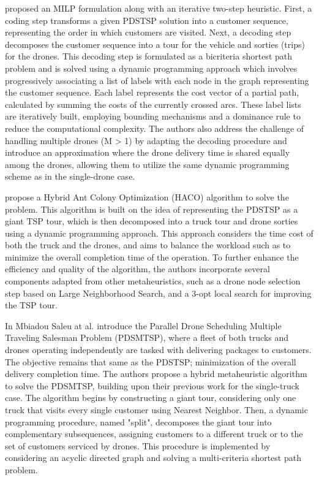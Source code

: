 \documentclass{article}
\begin{document}
	\par
	\citeauthor{MbiadouSaleu2018} \cite{MbiadouSaleu2018} proposed an MILP formulation along with an iterative two-step heuristic. First, a coding step transforms a given PDSTSP solution into a customer sequence, representing the order in which customers are visited. Next, a decoding step decomposes the customer sequence into a tour for the vehicle and sorties (trips) for the drones. This decoding step is formulated as a bicriteria shortest path problem \cite{biCriteriaSP} and is solved using a dynamic programming approach which involves progressively associating a list of labels with each node in the graph representing the customer sequence. Each label represents the cost vector of a partial path, calculated by summing the costs of the currently crossed arcs. These label lists are iteratively built, employing bounding mechanisms and a dominance rule to reduce the computational complexity. The authors also address the challenge of handling multiple drones (M > 1) by adapting the decoding procedure and introduce an approximation where the drone delivery time is shared equally among the drones, allowing them to utilize the same dynamic programming scheme as in the single-drone case.
	\par 
	\citeauthor{Dinh2021} \cite{Dinh2021} propose a Hybrid Ant Colony Optimization (HACO) algorithm to solve the problem. This algorithm is built on the idea of representing the PDSTSP as a giant TSP tour, which is then decomposed into a truck tour and drone sorties using a dynamic programming approach. This approach considers the time cost of both the truck and the drones, and aims to balance the workload such as to minimize the overall completion time of the operation. To further enhance the efficiency and quality of the algorithm, the authors incorporate several components adapted from other metaheuristics, such as a drone node selection step based on Large Neighborhood Search, and a 3-opt local search for improving the TSP tour.
	\par
	In \cite{MbiadouSaleu2022} Mbiadou Saleu at al. introduce the Parallel Drone Scheduling Multiple Traveling Salesman Problem (PDSMTSP), where a fleet of both trucks and drones operating independently are tasked with delivering packages to customers. The objective remains that same as the PDSTSP; minimization of the overall delivery completion time. The authors propose a hybrid metaheuristic algorithm to solve the PDSMTSP, building upon their previous work for the single-truck case. The algorithm begins by constructing a giant tour, considering only one truck that visits every single customer using Nearest Neighbor. Then, a dynamic programming procedure, named "split", decomposes the giant tour into complementary subsequences, assigning customers to a different truck or to the set of customers serviced by drones. This procedure is implemented by considering an acyclic directed graph and solving a multi-criteria shortest path problem.
\end{document}
